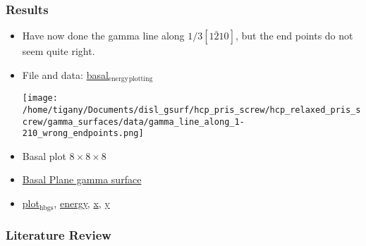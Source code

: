 \documentclass[11pt]{article}
\begin{document}
\subsubsection{Results}
\label{sec:org0346d1b}
\begin{itemize}
\item Have now done the gamma line along \(1/3[1\bar{2}10]\), but the end points
do not seem quite right.
\item File and data: \href{file:///home/tigany/Documents/disl\_gsurf/hcp\_pris\_screw/hcp\_relaxed\_pris\_screw/gamma\_surfaces/data/plot\_hsbc\_pkl.py}{basal\(_{\text{energy}}\)\(_{\text{plotting}}\)} \begin{center}
\texttt{[image: /home/tigany/Documents/disl\_gsurf/hcp\_pris\_screw/hcp\_relaxed\_pris\_screw/gamma\_surfaces/data/gamma\_line\_along\_1-210\_wrong\_endpoints.png]}
\end{center}
\item Basal plot \(8\times 8\times 8\)
\item \href{file:///home/tigany/Documents/disl\_gsurf/hcp\_pris\_screw/hcp\_relaxed\_pris\_screw/gamma\_surfaces/data/supercell\_8-8-8/Figures/gamma\_surface\_8-8-8\_basal\_tbe.png}{Basal Plane gamma surface}
\item \href{file:///home/tigany/Documents/disl\_gsurf/hcp\_pris\_screw/hcp\_relaxed\_pris\_screw/gamma\_surfaces/data/supercell\_8-8-8/plot\_hsbc\_pkl.py}{plot\(_{\text{hbgs}}\)}, \href{file:///home/tigany/Documents/disl\_gsurf/hcp\_pris\_screw/hcp\_relaxed\_pris\_screw/gamma\_surfaces/data/supercell\_8-8-8/hgsBte888.pkl}{energy}, \href{file:///home/tigany/Documents/disl\_gsurf/hcp\_pris\_screw/hcp\_relaxed\_pris\_screw/gamma\_surfaces/data/supercell\_8-8-8/hgsBtx888.pkl\%20}{x}, \href{file:///home/tigany/Documents/disl\_gsurf/hcp\_pris\_screw/hcp\_relaxed\_pris\_screw/gamma\_surfaces/data/supercell\_8-8-8/hgsBty888.pkl\%20}{y}
\end{itemize}


\subsubsection{Literature Review}
\label{sec:org0a415e9}
\end{document}
